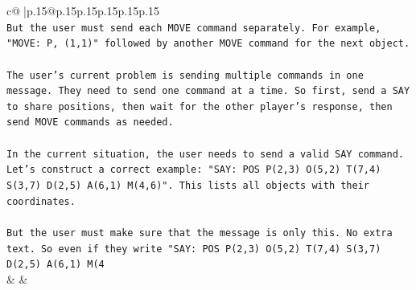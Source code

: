 \documentclass{article}
\begin{document}
{\begin{supertabular}{c@{$\;$}|p{.15\linewidth}@{}p{.15\linewidth}p{.15\linewidth}p{.15\linewidth}p{.15\linewidth}p{.15\linewidth}}
{{{\\ 
\texttt{But the user must send each MOVE command separately. For example, "MOVE: P, (1,1)" followed by another MOVE command for the next object.} \\
\\ 
\texttt{The user's current problem is sending multiple commands in one message. They need to send one command at a time. So first, send a SAY to share positions, then wait for the other player's response, then send MOVE commands as needed.} \\
\\ 
\texttt{In the current situation, the user needs to send a valid SAY command. Let's construct a correct example: "SAY: POS P(2,3) O(5,2) T(7,4) S(3,7) D(2,5) A(6,1) M(4,6)". This lists all objects with their coordinates.} \\
\\ 
\texttt{But the user must make sure that the message is only this. No extra text. So even if they write "SAY: POS P(2,3) O(5,2) T(7,4) S(3,7) D(2,5) A(6,1) M(4} \\
            }
        }
    }
    & & \\ \\


\end{supertabular}}
\end{document}
